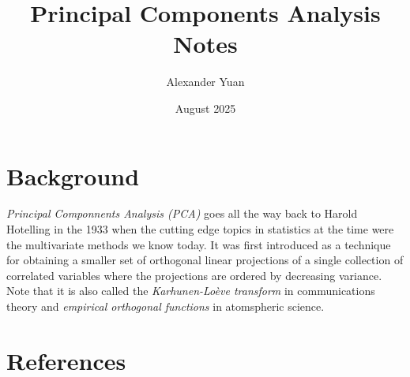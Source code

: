 \documentclass{article}
\title{Principal Components Analysis Notes}
\author{Alexander Yuan}
\date{August 2025}
\begin{document}
 
\maketitle

\section{Background}
\emph{Principal Componnents Analysis (PCA)} goes all the way back to Harold Hotelling in the 1933 when the cutting edge topics in statistics at the time were the multivariate methods we know today. It was first 
introduced as a technique for obtaining a smaller set of orthogonal linear projections of a single collection of correlated variables where the projections are ordered by decreasing variance. Note that it is also
called the \emph{Karhunen-Loève transform} in communications theory and \emph{empirical orthogonal functions} in atomspheric science.

\section{References}
\end{document}
